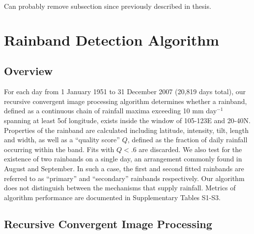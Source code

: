 Can probably remove subsection since previously described in thesis.

	
\section{Rainband Detection Algorithm}

\subsection{Overview}

	For each day from 1 January 1951 to 31 December 2007 (20,819 days total), our recursive convergent image processing algorithm determines whether a rainband, defined as a continuous chain of rainfall maxima exceeding 10 mm day$^{-1}$ spanning at least 5\textdegree of longitude, exists inside the window of 105-123\textdegree E and 20-40\textdegree N. Properties of the rainband are calculated including latitude, intensity, tilt, length and width, as well as a ``quality score'' $Q$, defined as the fraction of daily rainfall occurring within the band. Fits with $Q<.6$ are discarded. We also test for the existence of two rainbands on a single day, an arrangement commonly found in August and September. In such a case, the first and second fitted rainbands are referred to as ``primary'' and ``secondary'' rainbands respectively. Our algorithm does not distinguish between the mechanisms that supply rainfall. Metrics of algorithm performance are documented in Supplementary Tables S1-S3. 
	
\subsection{Recursive Convergent Image Processing}

